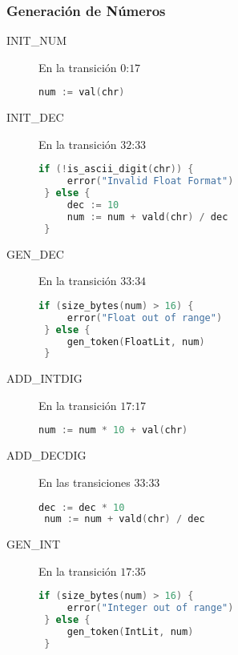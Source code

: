 \documentclass[a4paper]{CSMakotoTechnicalReport}
\begin{document}
    \begin{minipage}{\textwidth}
    \subsubsection{Generación de Números}

    \begin{multicols}{2}

    \begin{description}
        \item[INIT\_NUM] En la transición $0$:$17$
            \begin{lstlisting}[language=C]
 num := val(chr)
            \end{lstlisting}

        \item[INIT\_DEC] En la transición $32$:$33$
            \begin{lstlisting}[language=C]
 if (!is_ascii_digit(chr)) {
     error("Invalid Float Format")
 } else {
     dec := 10
     num := num + vald(chr) / dec
 }
            \end{lstlisting}

        \item[GEN\_DEC] En la transición $33$:$34$
            \begin{lstlisting}[language=C]
 if (size_bytes(num) > 16) {
     error("Float out of range")
 } else {
     gen_token(FloatLit, num)
 }
            \end{lstlisting}

            \columnbreak

        \item[ADD\_INTDIG] En la transición $17$:$17$
            \begin{lstlisting}[language=C]
 num := num * 10 + val(chr)
            \end{lstlisting}

            \vspace{0.03\textheight}
        \item[ADD\_DECDIG] En las transiciones $33$:$33$
            \begin{lstlisting}[language=C]
 dec := dec * 10
 num := num + vald(chr) / dec
            \end{lstlisting}

            \vspace{0.02\textheight}
        \item[GEN\_INT] En la transición $17$:$35$
            \begin{lstlisting}[language=C]
 if (size_bytes(num) > 16) {
     error("Integer out of range")
 } else {
     gen_token(IntLit, num)
 }
            \end{lstlisting}


\end{description}
\end{multicols}
\end{minipage}
\end{document}
